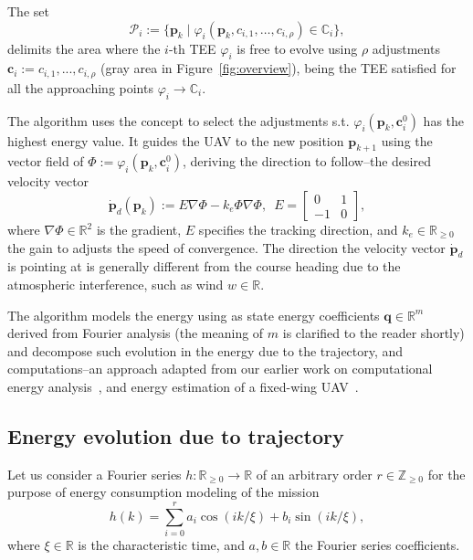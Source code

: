 \documentclass[letterpaper,10pt,conference]{ieeeconf}
\theoremstyle{definition}
\begin{document}
The set
\begin{equation}\label{eq:area}
  \mathcal{P}_i:=\{\mathbf{p}_k\mid\varphi_i(\mathbf{p}_k,c_{i,1},\dots,c_{i,\rho})\in\mathbb{C}_i\},
\end{equation}
delimits the area where the $i$-th TEE $\varphi_i$ is free to evolve using $\rho$ adjustments $\mathbf{c}_i:=c_{i,1},...,c_{i,\rho}$ (gray area in Figure~\ref{fig:overview}), being the TEE satisfied for all the approaching points $\varphi_i\rightarrow\mathbb{C}_i$.

The algorithm uses the concept to select the adjustments s.t. $\varphi_i(\mathbf{p}_k,\mathbf{c}_i^0)$ has the highest energy value. It guides the UAV to the new position $\mathbf{p}_{k+1}$ using the vector field of $\varPhi:=\varphi_i(\mathbf{p}_k,\mathbf{c}_i^0)$, deriving the direction to follow--the desired velocity vector
\begin{equation}\label{eq:pd}
  \dot{\mathbf{p}}_d(\mathbf{p}_k):=E\nabla\varPhi-k_e\varPhi\nabla\varPhi,\,\,\,E=\begin{bmatrix}
    0&1\\-1&0
  \end{bmatrix},
\end{equation}
where $\nabla\varPhi\in\mathbb{R}^2$ is the gradient, $E$ specifies the tracking direction, and $k_e\in\mathbb{R}_{\geq 0}$ the gain to adjusts the speed of convergence. The direction the velocity vector $\dot{\mathbf{p}}_d$ is pointing at is generally different from the course heading due to the atmospheric interference, such as wind $w\in\mathbb{R}$.

The algorithm models the energy using as state energy coefficients $\mathbf{q}\in\mathbb{R}^m$ derived from Fourier analysis (the meaning of $m$ is clarified to the reader shortly) and decompose such evolution in the energy due to the trajectory, and computations--an approach adapted from our earlier work on computational energy analysis~\cite{seewald2019coarse, seewald2019component}, and energy estimation of a fixed-wing UAV~\cite{seewald2020mechanical}. 

\subsection{Energy evolution due to trajectory}
\label{sec:energy-model}

Let us consider a Fourier series $h:\mathbb{R}_{\geq 0}\rightarrow\mathbb{R}$ of an arbitrary order $r\in\mathbb{Z}_{\geq 0}$ for the purpose of energy consumption modeling of the mission
\begin{equation}\label{eq:fourier}
  h(k)=\sum_{i=0}^{r}{a_i\cos\left({ik/\xi}\right)+b_i\sin{\left({ik/\xi}\right)}},
\end{equation}
where $\xi\in\mathbb{R}$ is the characteristic time, and $a,b\in\mathbb{R}$ the Fourier series coefficients.
\end{document}
